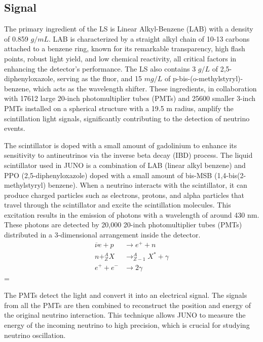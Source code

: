 \subsection{Signal}

The primary ingredient of the LS is Linear Alkyl-Benzene (LAB) with a density of 0.859 $g/mL$. LAB is characterized by a straight alkyl chain of 10-13 carbons attached to a benzene ring, known for its remarkable transparency, high flash points, robust light yield, and low chemical reactivity, all critical factors in enhancing the detector's performance. The LS also contains 3 $g/L$ of 2,5-diphenyloxazole, serving as the fluor, and 15 $mg/L$ of p-bis-(o-methylstyryl)-benzene, which acts as the wavelength shifter. These ingredients, in collaboration with 17612 large 20-inch photomultiplier tubes (PMTs) and 25600 smaller 3-inch PMTs installed on a spherical structure with a 19.5 m radius, amplify the scintillation light signals, significantly contributing to the detection of neutrino events.

The scintillator is doped with a small amount of gadolinium to enhance its sensitivity to antineutrinos via the inverse beta decay (IBD) process. The liquid scintillator used in JUNO is a combination of LAB (linear alkyl benzene) and PPO (2,5-diphenyloxazole) doped with a small amount of bis-MSB (1,4-bis(2-methylstyryl) benzene). When a neutrino interacts with the scintillator, it can produce charged particles such as electrons, protons, and alpha particles that travel through the scintillator and excite the scintillation molecules. This excitation results in the emission of photons with a wavelength of around 430 nm. These photons are detected by 20,000 20-inch photomultiplier tubes (PMTs) distributed in a 3-dimensional arrangement inside the detector.\\




\begin{equation}
	\begin{aligned}
		\overline{\nu}e + p &\rightarrow e^+ + n \\
		n + ^A_ZX &\rightarrow ^{A}_{Z-1}X^* + \gamma \\
		e^+ + e^- &\rightarrow 2\gamma
	\end{aligned}
\end{equation} =

The PMTs detect the light and convert it into an electrical signal. The signals from all the PMTs are then combined to reconstruct the position and energy of the original neutrino interaction. This technique allows JUNO to measure the energy of the incoming neutrino to high precision, which is crucial for studying neutrino oscillation.

